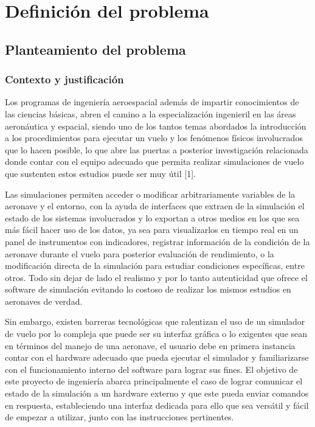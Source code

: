 \chapter{Definición del problema}

\section{Planteamiento del problema}

\subsection{Contexto y justificación}

Los programas de ingeniería aeroespacial además de impartir conocimientos de las ciencias básicas, abren el camino a la especialización ingenieril en las áreas aeronáutica y espacial, siendo uno de los tantos temas abordados la introducción a los procedimientos para ejecutar un vuelo y los fenómenos físicos involucrados que lo hacen posible, lo que abre las puertas a posterior investigación relacionada donde contar con el equipo adecuado que permita realizar simulaciones de vuelo que sustenten estos estudios puede ser muy útil [1].

Las simulaciones permiten acceder o modificar arbitrariamente variables de la aeronave y el entorno, con la ayuda de interfaces que extraen de la simulación el estado de los sistemas involucrados y lo exportan a otros medios en los que sea más fácil hacer uso de los datos, ya sea para visualizarlos en tiempo real en un panel de instrumentos con indicadores, registrar información de la condición de la aeronave durante el vuelo para posterior evaluación de rendimiento, o la modificación directa de la simulación para estudiar condiciones específicas, entre otros. Todo sin dejar de lado el realismo y por lo tanto autenticidad que ofrece el software de simulación evitando lo costoso de realizar los mismos estudios en aeronaves de verdad.

Sin embargo, existen barreras tecnológicas que ralentizan el uso de un simulador de vuelo por lo compleja que puede ser su interfaz gráfica o lo exigentes que sean en términos del manejo de una aeronave, el usuario debe en primera instancia contar con el hardware adecuado que pueda ejecutar el simulador y familiarizarse con el funcionamiento interno del software para lograr sus fines. El objetivo de este proyecto de ingeniería abarca principalmente el caso de lograr comunicar el estado de la simulación a un hardware externo y que este pueda enviar comandos en respuesta, estableciendo una interfaz dedicada para ello que sea versátil y fácil de empezar a utilizar, junto con las instrucciones pertinentes.

